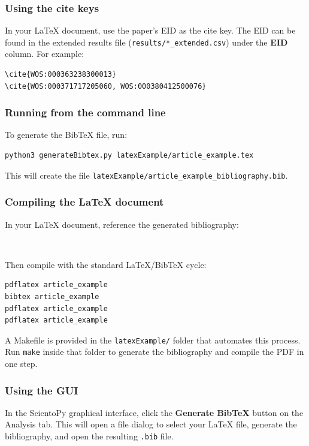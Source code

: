 \documentclass[10pt,letterpaper]{article}
\begin{document}
\subsubsection{Using the cite keys}

In your LaTeX document, use the paper's EID as the cite key. The EID can be found in the extended results file (\verb|results/*_extended.csv|) under the \textbf{EID} column. For example:

\begin{verbatim}
\cite{WOS:000363238300013}
\cite{WOS:000371717205060, WOS:000380412500076}
\end{verbatim}

\subsubsection{Running from the command line}

To generate the BibTeX file, run:

\begin{verbatim}
python3 generateBibtex.py latexExample/article_example.tex
\end{verbatim}

This will create the file \verb|latexExample/article_example_bibliography.bib|.

\subsubsection{Compiling the LaTeX document}

In your LaTeX document, reference the generated bibliography:

\begin{verbatim}


\end{verbatim}

Then compile with the standard LaTeX/BibTeX cycle:

\begin{verbatim}
pdflatex article_example
bibtex article_example
pdflatex article_example
pdflatex article_example
\end{verbatim}

A Makefile is provided in the \verb|latexExample/| folder that automates this process. Run \verb|make| inside that folder to generate the bibliography and compile the PDF in one step.

\subsubsection{Using the GUI}

In the ScientoPy graphical interface, click the \textbf{Generate BibTeX} button on the Analysis tab. This will open a file dialog to select your LaTeX file, generate the bibliography, and open the resulting \verb|.bib| file.
\end{document}
